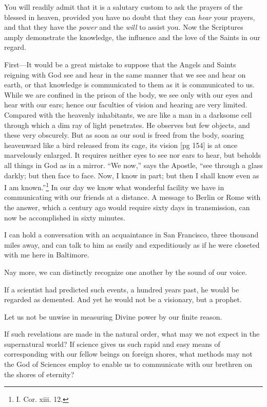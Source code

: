 You will readily admit that it is a salutary
custom to ask the prayers of the blessed in heaven,
provided you have no doubt that they can \emph{hear}
your prayers, and that they have the \emph{power} and
the \emph{will} to assist you. Now the Scriptures amply
demonstrate the knowledge, the influence and the
love of the Saints in our regard.

First—It would be a great mistake to suppose
that the Angels and Saints reigning with God see
and hear in the same manner that we see and hear
on earth, or that knowledge is communicated to
them as it is communicated to us. While we are
confined in the prison of the body, we see only with
our eyes and hear with our ears; hence our
faculties of vision and hearing are very limited.
Compared with the heavenly inhabitants, we are
like a man in a darksome cell through which a dim
ray of light penetrates. He observes but few objects,
and these very obscurely. But as soon as
our soul is freed from the body, soaring heavenward
like a bird released from its cage, its vision
[pg 154]
is at once marvelously enlarged. It requires
neither eyes to see nor ears to hear, but beholds
all things in God as in a mirror. “We now,” says
the Apostle, “see through a glass darkly; but then
face to face. Now, I know in part; but then I shall
know even as I am known.”\footnote{I.
Cor. xiii. 12.} In our day we know
what wonderful facility we have in communicating
with our friends at a distance. A message to Berlin
or Rome with the answer, which a century ago
would require sixty days in transmission, can now
be accomplished in sixty minutes.

I can hold a conversation with an acquaintance
in San Francisco, three thousand miles away, and
can talk to him as easily and expeditiously as if he
were closeted with me here in Baltimore.

Nay more, we can distinctly recognize one another
by the sound of our voice.

If a scientist had predicted such events, a hundred
years past, he would be regarded as demented.
And yet he would not be a visionary, but a prophet.

Let us not be unwise in measuring Divine power
by our finite reason.

If such revelations are made in the natural order,
what may we not expect in the supernatural
world? If science gives us such rapid and easy
means of corresponding with our fellow beings on
foreign shores, what methods may not the God of
Sciences employ to enable us to communicate with
our brethren on the shores of eternity?

